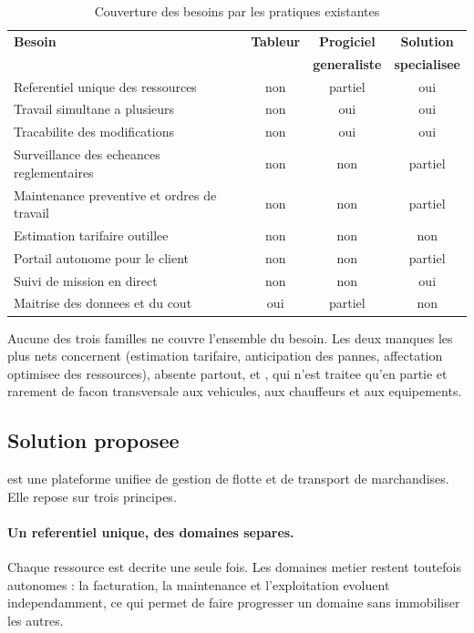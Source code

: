 \begin{table}[H]
\centering
\caption{Couverture des besoins par les pratiques existantes}
\label{tab:critique-existant}
\small
\begin{tabularx}{\textwidth}{@{}Xccc@{}}
\toprule
\textbf{Besoin} & \textbf{Tableur} & \textbf{Progiciel} & \textbf{Solution} \\
                &                  & \textbf{generaliste} & \textbf{specialisee} \\
\midrule
Referentiel unique des ressources      & non      & partiel  & oui \\
Travail simultane a plusieurs          & non      & oui      & oui \\
Tracabilite des modifications          & non      & oui      & oui \\
Surveillance des echeances reglementaires & non   & non      & partiel \\
Maintenance preventive et ordres de travail & non & non      & partiel \\
Estimation tarifaire outillee          & non      & non      & non \\
Portail autonome pour le client        & non      & non      & partiel \\
Suivi de mission en direct             & non      & non      & oui \\
Maitrise des donnees et du cout        & oui      & partiel  & non \\
\bottomrule
\end{tabularx}
\end{table}

Aucune des trois familles ne couvre l'ensemble du besoin. Les deux
manques les plus nets concernent 
(estimation tarifaire, anticipation des pannes, affectation optimisee des
ressources), absente partout, et , qui n'est traitee qu'en partie et rarement de facon
transversale aux vehicules, aux chauffeurs et aux equipements.

\subsection{Solution proposee}

\sujetCourt{} est une plateforme unifiee de gestion de flotte et de
transport de marchandises. Elle repose sur trois principes.

\paragraph{Un referentiel unique, des domaines separes.}
Chaque ressource est decrite une seule fois. Les domaines metier restent
toutefois autonomes : la facturation, la maintenance et l'exploitation
evoluent independamment, ce qui permet de faire progresser un domaine
sans immobiliser les autres.

